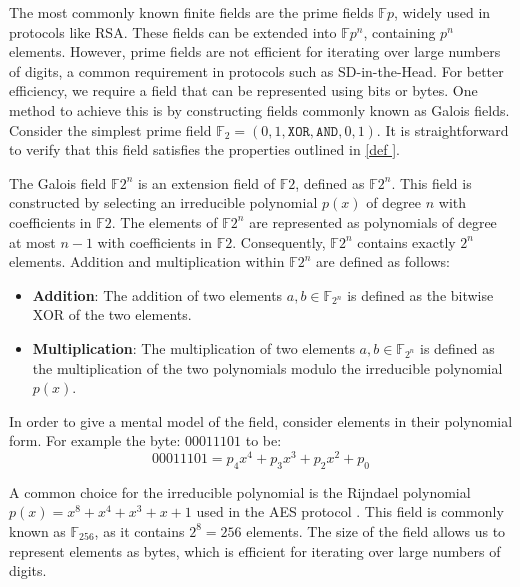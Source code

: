 \documentclass[twoside,11pt,openright]{report}
\theoremstyle{definition}
\theoremstyle{plain}
\begin{document}
\noindent
The most commonly known finite fields are the prime fields $\mathbb{F}p$, widely used in protocols like RSA. These fields can be extended into $\mathbb{F}{p^n}$, containing $p^n$ elements. However, prime fields are not efficient for iterating over large numbers of digits, a common requirement in protocols such as SD-in-the-Head. For better efficiency, we require a field that can be represented using bits or bytes. One method to achieve this is by constructing fields commonly known as Galois fields. Consider the simplest prime field $\mathbb{F}_2 = ({0,1}, \texttt{XOR}, \texttt{AND}, 0, 1)$. It is straightforward to verify that this field satisfies the properties outlined in \autoref{def
}.

The Galois field $\mathbb{F}{2^n}$ is an extension field of $\mathbb{F}2$, defined as $\mathbb{F}{2^n}$. This field is constructed by selecting an irreducible polynomial $p(x)$ of degree $n$ with coefficients in $\mathbb{F}2$. The elements of $\mathbb{F}{2^n}$ are represented as polynomials of degree at most $n-1$ with coefficients in $\mathbb{F}2$. Consequently, $\mathbb{F}{2^n}$ contains exactly $2^n$ elements. Addition and multiplication within $\mathbb{F}{2^n}$ are defined as follows: 

\begin{itemize}
  \item \textbf{Addition}: The addition of two elements $a,b \in \mathbb{F}_{2^n}$ is defined as the bitwise XOR of the two elements.
  \item \textbf{Multiplication}: The multiplication of two elements $a,b \in \mathbb{F}_{2^n}$ is defined as the multiplication of the two polynomials modulo the irreducible polynomial $p(x)$.
\end{itemize}

In order to give a mental model of the field, consider elements in their polynomial form. For example the byte: ${00011101}$ to be:
\begin{equation}
  \label{eq:example_poly}
  00011101 = p_4x^4 + p_3x^3 + p_2x^2 + p_0
\end{equation}

A common choice for the irreducible polynomial is the Rijndael polynomial $p(x) = x^8 + x^4 + x^3 + x + 1$ used in the AES protocol \cite{brownadvanced}. This field is commonly known as $\mathbb{F}_{256}$, as it contains $2^8 = 256$ elements. The size of the field allows us to represent elements as bytes, which is efficient for iterating over large numbers of digits.
\end{document}

